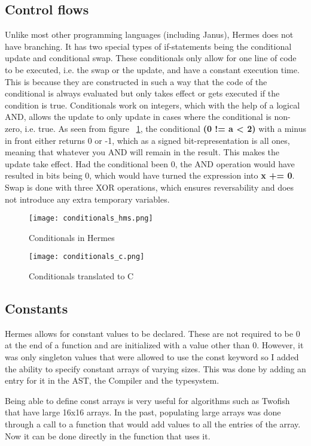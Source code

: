 \subsection{Control flows}
Unlike most other programming languages (including Janus), Hermes does not have branching. It has two special types of if-statements being the conditional update and conditional swap. These conditionals only allow for one line of code to be executed, i.e. the swap or the update, and have a constant execution time. This is because they are constructed in such a way that the code of the conditional is always evaluated but only takes effect or gets executed if the condition is true.
Conditionals work on integers, which with the help of a logical AND, allows the update to only update in cases where the conditional is non-zero, i.e. true. As seen from figure ~\ref{fig:conditionals_c}, the conditional \textbf{(0 != a < 2)} with a minus in front either returns 0 or -1, which as a signed bit-representation is all ones, meaning that whatever you AND will remain in the result. This makes the update take effect. Had the conditional been 0, the AND operation would have resulted in bits being 0, which would have turned the expression into \textbf{x += 0}.
Swap is done with three XOR operations, which ensures reversability and does not introduce any extra temporary variables.
\begin{figure}
    \centering
    \begin{minipage}{0.35\textwidth}
        \centering
        \texttt{[image: conditionals\_hms.png]}
        \caption{Conditionals in Hermes}
    \end{minipage}\hfill
    \begin{minipage}{0.60\textwidth}
        \centering
        \texttt{[image: conditionals\_c.png]}
        \caption{Conditionals translated to C}
        \label{fig:conditionals_c}
    \end{minipage}
\end{figure}

\subsection{Constants}
Hermes allows for constant values to be declared. These are not required to be 0 at the end of a function and are initialized with a value other than 0. However, it was only singleton values that were allowed to use the const keyword so I added the ability to specify constant arrays of varying sizes. This was done by adding an entry for it in the AST, the Compiler and the typesystem.

Being able to define const arrays is very useful for algorithms such as Twofish that have large 16x16 arrays. In the past, populating large arrays was done through a call to a function that would add values to all the entries of the array. Now it can be done directly in the function that uses it.
